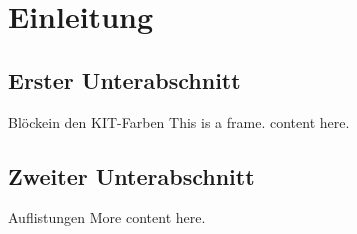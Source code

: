 \section{Einleitung}

\subsection{Erster Unterabschnitt}
\begin{frame}{Blöcke}{in den KIT-Farben}
    This is a frame. content here.
\end{frame}

\subsection{Zweiter Unterabschnitt}
\begin{frame}{Auflistungen}
    More content here.
\end{frame}
